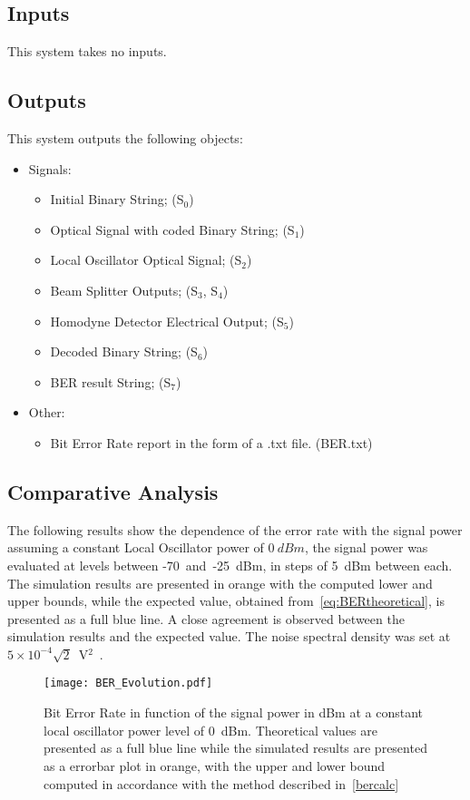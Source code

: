 \subsection*{Inputs}

This system takes no inputs.

\subsection*{Outputs}

This system outputs the following objects:
\begin{itemize}
\item Signals:
\begin{itemize}
\item Initial Binary String; (S$_0$)
\item Optical Signal with coded Binary String; (S$_{1}$)
\item Local Oscillator Optical Signal; (S$_{2}$)
\item Beam Splitter Outputs; (S$_{3}$, S$_{4}$)
\item Homodyne Detector Electrical Output; (S$_{5}$)
\item Decoded Binary String; (S$_{6}$)
\item BER result String; (S$_{7}$)
\end{itemize}
\item Other:
\begin{itemize}
\item Bit Error Rate report in the form of a .txt file. (BER.txt)
\end{itemize}
\end{itemize}

\subsection*{Comparative Analysis}

The following results show the dependence of the error rate with the signal power assuming a constant Local Oscillator power of $0~dBm$, the signal power was evaluated at levels between -70~and~-25~dBm, in steps of 5~dBm between each. The simulation results are presented in orange with the computed lower and upper bounds, while the expected value, obtained from~\eqref{eq:BERtheoretical}, is presented as a full blue line. A close agreement is observed between the simulation results and the expected value. The noise spectral density was set at $5\times10^{-4}\sqrt{2}$~V$^2$~\cite{thorlabs}. 
\begin{figure}[H]
\centering
\texttt{[image: BER\_Evolution.pdf]}
\caption{Bit Error Rate in function of the signal power in dBm at a constant local oscillator power level of 0~dBm. Theoretical values are presented as a full blue line while the simulated results are presented as a errorbar plot in orange, with the upper and lower bound computed in accordance with the method described in~\ref{bercalc}}
\label{fig:berevolution}
\end{figure}


 
